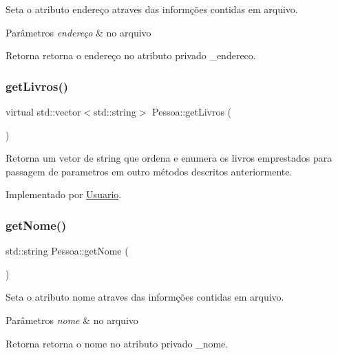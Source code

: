Seta o atributo endereço atraves das informções contidas em arquivo. 
\begin{DoxyParams}{Parâmetros}
{\em endereço} & no arquivo \\
\hline
\end{DoxyParams}
\begin{DoxyReturn}{Retorna}
retorna o endereço no atributo privado \+\_\+endereco. 
\end{DoxyReturn}
\mbox{\label{class_pessoa_a9f6907ce8a5ef6fc942f0fa0d1f27854}} 
\subsubsection{\texorpdfstring{getLivros()}{getLivros()}}
{\footnotesize\ttfamily virtual std\+::vector$<$std\+::string$>$ Pessoa\+::get\+Livros (\begin{DoxyParamCaption}{ }\end{DoxyParamCaption})\hspace{0.3cm}{\ttfamily [pure virtual]}}

\begin{DoxyReturn}{Retorna}
um vetor de string que ordena e enumera os livros emprestados para passagem de parametros em outro métodos descritos anteriormente. 
\end{DoxyReturn}


Implementado por \mbox{\hyperlink{class_usuario_ace50554a36f9deb7387bb2146295dedb}{Usuario}}.

\mbox{\label{class_pessoa_a5f4f2063d62eaea38673da5fd5283465}} 
\subsubsection{\texorpdfstring{getNome()}{getNome()}}
{\footnotesize\ttfamily std\+::string Pessoa\+::get\+Nome (\begin{DoxyParamCaption}{ }\end{DoxyParamCaption})}

Seta o atributo nome atraves das informções contidas em arquivo. 
\begin{DoxyParams}{Parâmetros}
{\em nome} & no arquivo \\
\hline
\end{DoxyParams}
\begin{DoxyReturn}{Retorna}
retorna o nome no atributo privado \+\_\+nome. 
\end{DoxyReturn}
\mbox{\label{class_pessoa_aca2ded64e7520692148ee84d923c5c28}} 
